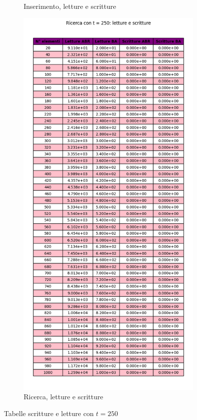 \begin{figure}[H]
\begin{subfigure}[b]{0.49\textwidth}
        \caption{Inserimento, letture e scritture}
        \label{fig:tableinsertwr250}
    \end{subfigure}
    \hfill
    \begin{subfigure}[b]{0.49\textwidth}
        \centering
        \includegraphics[width=\textwidth]{tables/search-wr-t250.png}
        \caption{Ricerca, letture e scritture}
        \label{fig:tablesearchwr250}
    \end{subfigure}
    \caption{Tabelle scritture e letture con $t=250$}
    \label{fig:tablewr250}
\end{figure}



